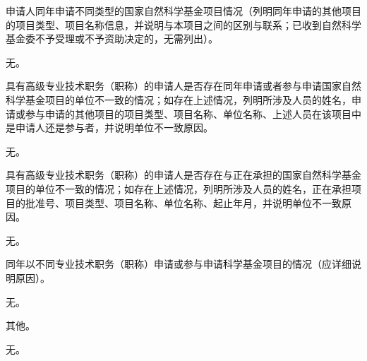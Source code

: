 \documentclass[12pt,UTF8,AutoFakeBold=3,a4paper,fontset=windows]{ctexart}
\newcommand{\kaishunumeng}[1]{{\kaishueng #1}}
\newcommand{\sihao}{\fontsize{14pt}{\baselineskip}\selectfont}
\begin{document}
\vskip 2mm
{\color{NsfcBlue} \sihao {}}
\vskip 2mm

{\sihao \color{NsfcBlue} \kaishu \kaishunumeng{1.} 申请人同年申请不同类型的国家自然科学基金项目情况（列明同年申请的其他项目的项目类型、项目名称信息，并说明与本项目之间的区别与联系；已收到自然科学基金委不予受理或不予资助决定的，无需列出）。 }
\vskip 2mm

无。

\vskip 2mm
{\sihao \color{NsfcBlue} \kaishu \kaishunumeng{2.} 具有高级专业技术职务（职称）的申请人是否存在同年申请或者参与申请国家自然科学基金项目的单位不一致的情况；如存在上述情况，列明所涉及人员的姓名，申请或参与申请的其他项目的项目类型、项目名称、单位名称、上述人员在该项目中是申请人还是参与者，并说明单位不一致原因。}
\vskip 2mm

无。

\vskip 2mm
{\sihao \color{NsfcBlue} \kaishu \kaishunumeng{3.} 具有高级专业技术职务（职称）的申请人是否存在与正在承担的国家自然科学基金项目的单位不一致的情况；如存在上述情况，列明所涉及人员的姓名，正在承担项目的批准号、项目类型、项目名称、单位名称、起止年月，并说明单位不一致原因。}
\vskip 2mm

无。

\vskip 2mm
{\sihao \color{NsfcBlue} \kaishu \kaishunumeng{4.} 同年以不同专业技术职务（职称）申请或参与申请科学基金项目的情况（应详细说明原因）。}
\vskip 2mm

无。

\vskip 2mm
{\sihao \color{NsfcBlue} \kaishu \kaishunumeng{5.} 其他。}
\vskip 2mm

无。
\end{document}
